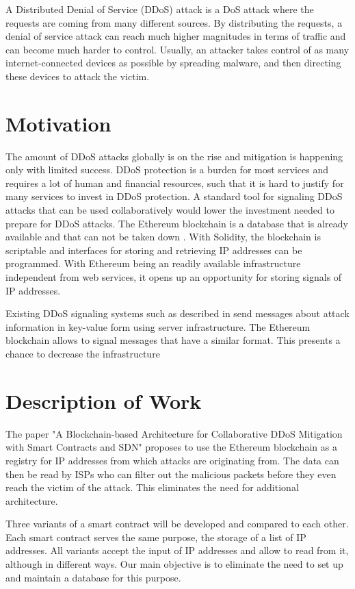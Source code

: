 A Distributed Denial of Service (DDoS) attack is a DoS attack where the requests are coming from many different sources. By distributing the requests, a denial of service attack can reach much higher magnitudes in terms of traffic and can become much harder to control.
Usually, an attacker takes control of as many internet-connected devices as possible by spreading malware, and then directing these devices to attack the victim.


\section{Motivation}

The amount of DDoS attacks globally is on the rise \cite{DDoSRise} and mitigation is happening only with limited success. 
DDoS protection is a burden for most services and requires a lot of human and financial resources, such that it is hard to justify for many services to invest in DDoS protection. A standard tool for signaling DDoS attacks that can be used collaboratively would lower the investment needed to prepare for DDoS attacks.
The Ethereum blockchain is a database that is already available and that can not be taken down \cite{Ethereum}. With Solidity, the blockchain is scriptable and interfaces for storing and retrieving IP addresses can be programmed. With Ethereum being an readily available infrastructure independent from web services, it opens up an opportunity for storing signals of IP addresses.

Existing DDoS signaling systems such as described in \cite{IETFDraft} send messages about attack information in key-value form using server infrastructure. The Ethereum blockchain allows to signal messages that have a similar format. This presents a chance to decrease the infrastructure

\section{Description of Work}

The paper {"}A Blockchain-based Architecture for Collaborative DDoS Mitigation with Smart Contracts and SDN{"} \cite{OriginalPaper} proposes to use the Ethereum blockchain as a registry for IP addresses from which attacks are originating from. The data can then be read by ISPs who can filter out the malicious packets before they even reach the victim of the attack. This eliminates the need for additional architecture.

Three variants of a smart contract will be developed and compared to each other. Each smart contract serves the same purpose, the storage of a list of IP addresses. All variants accept the input of IP addresses and allow to read from it, although in different ways.
Our main objective is to eliminate the need to set up and maintain a database for this purpose.

